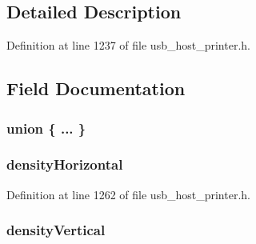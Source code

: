 \subsection{Detailed Description}


Definition at line 1237 of file usb\+\_\+host\+\_\+printer.\+h.



\subsection{Field Documentation}
\hypertarget{struct_u_s_b___p_r_i_n_t_e_r___i_m_a_g_e___i_n_f_o_a498f6a75947d6873d88f24d68f583fa9}{}\subsubsection[{"@425}]{\setlength{\rightskip}{0pt plus 5cm}union \{ ... \} }\label{struct_u_s_b___p_r_i_n_t_e_r___i_m_a_g_e___i_n_f_o_a498f6a75947d6873d88f24d68f583fa9}
\hypertarget{struct_u_s_b___p_r_i_n_t_e_r___i_m_a_g_e___i_n_f_o_a833107b4f38d9bf9d5aea1bd84d33ec9}{}
\subsubsection[{density\+Horizontal}]{ density\+Horizontal}\label{struct_u_s_b___p_r_i_n_t_e_r___i_m_a_g_e___i_n_f_o_a833107b4f38d9bf9d5aea1bd84d33ec9}


Definition at line 1262 of file usb\+\_\+host\+\_\+printer.\+h.

\hypertarget{struct_u_s_b___p_r_i_n_t_e_r___i_m_a_g_e___i_n_f_o_a3846900a03e6935affe41beb2786a3d9}{}
\subsubsection[{density\+Vertical}]{ density\+Vertical}\label{struct_u_s_b___p_r_i_n_t_e_r___i_m_a_g_e___i_n_f_o_a3846900a03e6935affe41beb2786a3d9}


